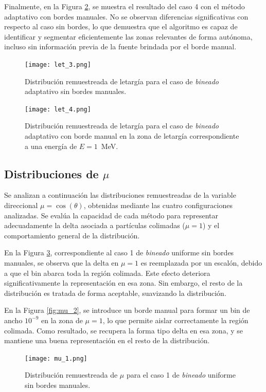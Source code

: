 Finalmente, en la Figura \ref{fig:let_4}, se muestra el resultado del caso 4 con el método adaptativo con bordes manuales. No se observan diferencias significativas con respecto al caso sin bordes, lo que demuestra que el algoritmo es capaz de identificar y segmentar eficientemente las zonas relevantes de forma autónoma, incluso sin información previa de la fuente brindada por el borde manual.

\begin{figure}[H]
    \centering
    \texttt{[image: let\_3.png]}
    \caption{Distribución remuestreada de letargía para el caso de \textit{bineado} adaptativo sin bordes manuales.}
    \label{fig:let_3}
\end{figure}

\begin{figure}[H]
    \centering
    \texttt{[image: let\_4.png]}
    \caption{Distribución remuestreada de letargía para el caso de \textit{bineado} adaptativo con borde manual en la zona de letargía correspondiente a una energía de $E = 1$~MeV.}
    \label{fig:let_4}
\end{figure}

\subsection{Distribuciones de $\mu$}
Se analizan a continuación las distribuciones remuestreadas de la variable direccional $\mu = \cos(\theta)$, obtenidas mediante las cuatro configuraciones analizadas. Se evalúa la capacidad de cada método para representar adecuadamente la delta asociada a partículas colimadas ($\mu = 1$) y el comportamiento general de la distribución.

En la Figura \ref{fig:mu_1}, correspondiente al caso 1 de \textit{bineado} uniforme sin bordes manuales, se observa que la delta en $\mu = 1$ es reemplazada por un escalón, debido a que el bin abarca toda la región colimada. Este efecto deteriora significativamente la representación en esa zona. Sin embargo, el resto de la distribución es tratada de forma aceptable, suavizando la distribución.

En la Figura \ref{fig:mu_2}, se introduce un borde manual para formar un bin de ancho $10^{-9}$ en la zona de $\mu = 1$, lo que permite aislar correctamente la región colimada. Como resultado, se recupera la forma tipo delta en esa zona, y se mantiene una buena representación en el resto de la distribución.

\begin{figure}[H]
    \centering
    \texttt{[image: mu\_1.png]}
    \caption{Distribución remuestreada de $\mu$ para el caso 1 de \textit{bineado} uniforme sin bordes manuales.}
    \label{fig:mu_1}
\end{figure}

